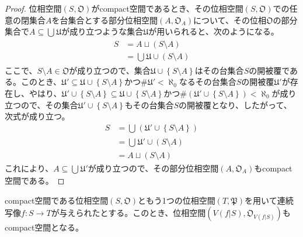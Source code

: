 \documentclass[dvipdfmx]{jsarticle}
\begin{document}
\begin{proof}
位相空間$\left( S,\mathfrak{O} \right)$がcompact空間であるとき、その位相空間$\left( S,\mathfrak{O} \right)$での任意の閉集合$A$を台集合とする部分位相空間$\left( A,\mathfrak{O}_{A} \right)$について、その位相$\mathfrak{O}$の部分集合で$A \subseteq \bigcup_{} \mathfrak{U}$が成り立つような集合$\mathfrak{U}$が用いられると、次のようになる。
\begin{align*}
S &= A \sqcup (S \setminus A)\\
&= \bigcup_{} \mathfrak{U} \cup (S \setminus A)
\end{align*}
ここで、$S \setminus A \in \mathfrak{O}$が成り立つので、集合$\mathfrak{U} \cup \left\{ S \setminus A \right\}$はその台集合$S$の開被覆である。このとき、$\mathfrak{U}'\subseteq \mathfrak{U \cup}\left\{ S \setminus A \right\}$かつ${\#}\mathfrak{U}' < \aleph_{0}$なるその台集合$S$の開被覆$\mathfrak{U}'$が存在し、やはり、$\mathfrak{U}' \cup \left\{ S \setminus A \right\}\subseteq \mathfrak{U \cup}\left\{ S \setminus A \right\}$かつ${\#}\left( \mathfrak{U}' \cup \left\{ S \setminus A \right\} \right) < \aleph_{0}$が成り立つので、その集合$\mathfrak{U}' \cup \left\{ S \setminus A \right\}$もその台集合$S$の開被覆となり、したがって、次式が成り立つ。
\begin{align*}
S &= \bigcup_{} \left( \mathfrak{U}' \cup \left\{ S \setminus A \right\} \right)\\
&= \bigcup_{} \mathfrak{U}' \cup (S \setminus A)\\
&= A \sqcup (S \setminus A)
\end{align*}
これにより、$A \subseteq \bigcup_{} \mathfrak{U}'$が成り立つので、その部分位相空間$\left( A,\mathfrak{O}_{A} \right)$もcompact空間である。
\end{proof}
\begin{thm}\label{8.1.6.5}
compact空間である位相空間$\left( S,\mathfrak{O} \right)$ともう1つの位相空間$\left( T,\mathfrak{P} \right)$を用いて連続写像$f:S \rightarrow T$が与えられたとする。このとき、位相空間$\left( V\left( f|S \right),\mathfrak{O}_{V\left( f|S \right)} \right)$もcompact空間となる。
\end{thm}
\end{document}
